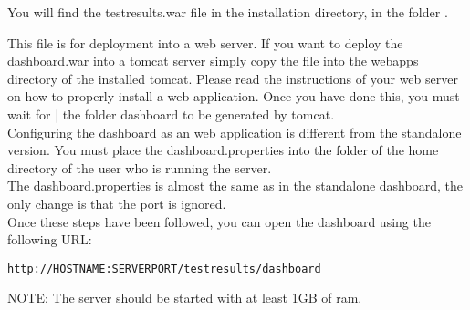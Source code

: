 You will find the testresults.war file in the installation directory, in the folder .

This file is for deployment into a web server. If you want to deploy the dashboard.war into a tomcat server simply copy the file into the webapps directory of the installed tomcat. Please read the instructions of your web server on how to properly install a web application. Once you have done this, you must wait for | the folder dashboard to be generated by tomcat. \\
Configuring the dashboard as an web application is different from the standalone version. You must place the dashboard.properties into the  folder of the home directory of the user who is running the server.\\
The dashboard.properties is almost the same as in the standalone dashboard, the only change is that the port is ignored. \\
Once these steps have been followed, you can open the dashboard using the following URL:
\begin{verbatim}
http://HOSTNAME:SERVERPORT/testresults/dashboard
\end{verbatim}

NOTE: The server should be started with at least 1GB of ram.